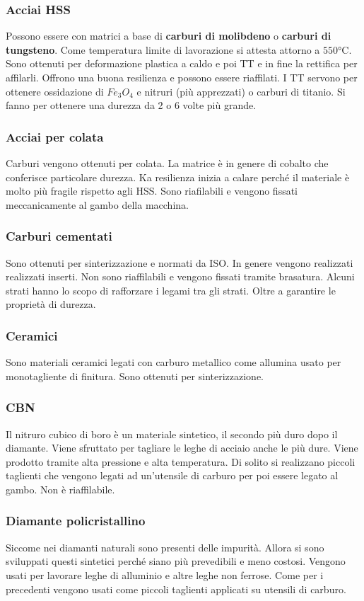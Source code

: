\subsubsection{Acciai HSS}
Possono essere con matrici a base di \textbf{carburi di molibdeno} o \textbf{carburi di tungsteno}.
Come temperatura limite di lavorazione si attesta attorno a $550\unit{\celsius}$.
Sono ottenuti per deformazione plastica a caldo e poi \ac{TT} e in fine la rettifica per affilarli.
Offrono una buona resilienza e possono essere riaffilati.
I \ac{TT} servono per ottenere ossidazione di $Fe_3O_4$ e nitruri (più apprezzati) o carburi di titanio.
Si fanno per ottenere una durezza da 2 o 6 volte più grande.
\subsubsection{Acciai per colata}
Carburi vengono ottenuti per colata. 
La matrice è in genere di cobalto che conferisce particolare durezza.
Ka resilienza inizia a calare perché il materiale è molto più fragile rispetto agli HSS.
Sono riafilabili e vengono fissati meccanicamente al gambo della macchina.
\subsubsection{Carburi cementati}
Sono ottenuti per sinterizzazione e normati da ISO.
In genere vengono realizzati realizzati inserti.
Non sono riaffilabili e vengono fissati tramite brasatura. Alcuni strati hanno lo scopo di rafforzare i legami tra gli strati. Oltre a garantire le proprietà di durezza.
\subsubsection{Ceramici}
Sono materiali ceramici legati con carburo metallico come allumina usato per monotagliente di finitura.
Sono ottenuti per sinterizzazione.
\subsubsection{CBN}
Il nitruro cubico di boro è un materiale sintetico, il secondo più duro dopo il diamante.
Viene sfruttato per tagliare le leghe di acciaio anche le più dure.
Viene prodotto tramite alta pressione e alta temperatura.
Di solito si realizzano piccoli taglienti che vengono legati ad un'utensile di carburo per poi essere legato al gambo.
Non è riaffilabile.
\subsubsection{Diamante policristallino}
Siccome nei diamanti naturali sono presenti delle impurità. Allora si sono sviluppati questi sintetici perché siano più prevedibili e meno costosi.
Vengono usati per lavorare leghe di alluminio e altre leghe non ferrose.
Come per i precedenti vengono usati come piccoli taglienti applicati su utensili di carburo.


